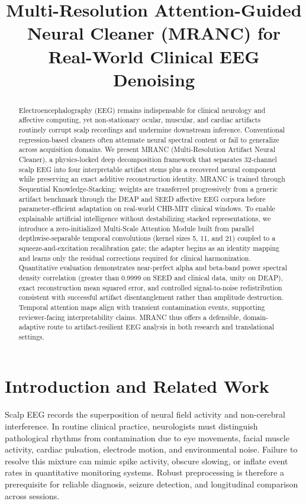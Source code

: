\documentclass[journal,twocolumn]{IEEEtran}
\title{Multi-Resolution Attention-Guided Neural Cleaner (MRANC) for Real-World Clinical EEG Denoising}
\author{%
\IEEEauthorblockN{Ghadeer Mostafa%
\thanks{Manuscript and software \copyright{} 2026 Ghadeer Mostafa. Licensed under CC BY-NC-SA 4.0.}}%
\IEEEauthorblockA{MRANC Research Project\\
GitHub: \url{https://github.com/GhadeerMostafa/EEG-MRANC}}%
}
\begin{document}
\maketitle
\begin{abstract}
Electroencephalography (EEG) remains indispensable for clinical neurology and affective computing, yet non-stationary ocular, muscular, and cardiac artifacts routinely corrupt scalp recordings and undermine downstream inference. Conventional regression-based cleaners often attenuate neural spectral content or fail to generalize across acquisition domains. We present MRANC (Multi-Resolution Artifact Neural Cleaner), a physics-locked deep decomposition framework that separates 32-channel scalp EEG into four interpretable artifact stems plus a recovered neural component while preserving an exact additive reconstruction identity. MRANC is trained through Sequential Knowledge-Stacking: weights are transferred progressively from a generic artifact benchmark through the DEAP and SEED affective EEG corpora before parameter-efficient adaptation on real-world CHB-MIT clinical windows. To enable explainable artificial intelligence without destabilizing stacked representations, we introduce a zero-initialized Multi-Scale Attention Module built from parallel depthwise-separable temporal convolutions (kernel sizes 5, 11, and 21) coupled to a squeeze-and-excitation recalibration gate; the adapter begins as an identity mapping and learns only the residual corrections required for clinical harmonization. Quantitative evaluation demonstrates near-perfect alpha and beta-band power spectral density correlation (greater than 0.9999 on SEED and clinical data, unity on DEAP), exact reconstruction mean squared error, and controlled signal-to-noise redistribution consistent with successful artifact disentanglement rather than amplitude destruction. Temporal attention maps align with transient contamination events, supporting reviewer-facing interpretability claims. MRANC thus offers a defensible, domain-adaptive route to artifact-resilient EEG analysis in both research and translational settings.

\end{abstract}

\section{Introduction and Related Work}\label{sec:intro}
Scalp EEG records the superposition of neural field activity and non-cerebral interference. In routine clinical practice, neurologists must distinguish pathological rhythms from contamination due to eye movements, facial muscle activity, cardiac pulsation, electrode motion, and environmental noise. Failure to resolve this mixture can mimic spike activity, obscure slowing, or inflate event rates in quantitative monitoring systems. Robust preprocessing is therefore a prerequisite for reliable diagnosis, seizure detection, and longitudinal comparison across sessions.
\end{document}
